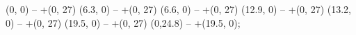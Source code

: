 \draw[thick]    
    (0, 0) -- +(0, 27)
    (6.3, 0) -- +(0, 27)
    (6.6, 0) -- +(0, 27)
    (12.9, 0) -- +(0, 27)
    (13.2, 0) -- +(0, 27)
    (19.5, 0) -- +(0, 27)
    (0,24.8) -- +(19.5, 0);